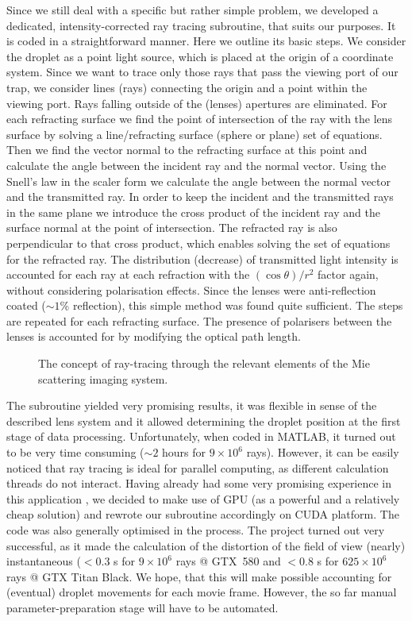 \documentclass[preprint,review,12pt,dvips]{elsarticle}
\begin{document}
Since we still deal with a specific but rather simple problem, we developed a dedicated, intensity-corrected ray tracing
subroutine, that suits our purposes. It is coded in a straightforward manner. Here we outline its basic steps. We consider
the droplet as a point light source, which is placed at the origin of a coordinate system. Since we want to trace only
those rays that pass the viewing port of our trap, we consider lines (rays) connecting the origin and a point within the
viewing port. Rays falling outside of the (lenses) apertures are eliminated. For each refracting surface we find the point
of intersection of the ray with the lens surface by solving a line/refracting surface (sphere or plane) set of equations.
Then we find the vector normal to the refracting surface at this point and calculate the angle between the incident ray
and the normal vector. Using the Snell's law in the scaler form we calculate the angle between the normal vector and the
transmitted ray. In order to keep the incident and the transmitted rays in the same plane we introduce the cross product
of the incident ray and the surface normal at the point of intersection. The refracted ray is also perpendicular to that
cross product, which enables solving the set of equations for the refracted ray. The distribution (decrease) of
transmitted light intensity is accounted for each ray at each refraction with the $(\cos \theta) /r^2$ factor again,
without considering polarisation effects. Since the lenses were anti-reflection coated ($\sim 1$\% reflection), this
simple method was found quite sufficient. The steps are repeated for each refracting surface. The presence of polarisers
between the lenses is accounted for by modifying the optical path length.
\begin{figure}[h!t!b!]
\begin{center}
\end{center}
\caption{The concept of ray-tracing through the relevant elements of the Mie scattering imaging
system.}\label{ray-tracing}
\end{figure}

The subroutine yielded very promising results, it was flexible in sense of the described lens system and it allowed
determining the droplet position at the first stage of data processing. Unfortunately, when coded in MATLAB, it turned out
to be very time consuming ($\sim 2$ hours for $9\times 10^6$ rays). However, it can be easily noticed that ray tracing is
ideal for parallel computing, as different calculation threads do not interact. Having already had some very promising
experience in this application \cite{Smigacz}, we decided to make use of GPU (as a powerful and a relatively cheap
solution) and rewrote our subroutine accordingly on CUDA platform. The code was also generally optimised in the process.
The project turned out very successful, as it made the calculation of the distortion of the field of view (nearly)
instantaneous ($<0.3$ s for $9\times 10^6$ rays @ GTX~580 and $<0.8$ s for $625\times 10^6$ rays @ GTX Titan Black. We
hope, that this will make possible accounting for (eventual) droplet movements for each movie frame. However, the so far
manual parameter-preparation stage will have to be automated.
\end{document}
